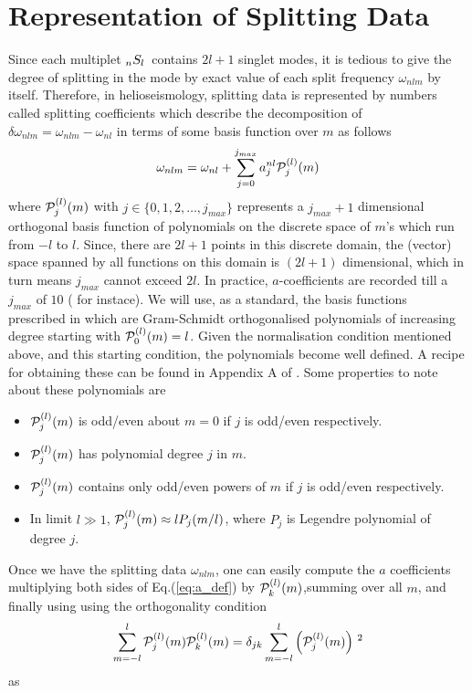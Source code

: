 \section{Representation of Splitting Data}
Since each multiplet $_{n}S_{l}\,$ contains $2l+1$ singlet modes, it is tedious to give the degree of splitting in the mode by exact value of each split frequency $\omega_{nlm}$ by itself. Therefore, in helioseismology, splitting data is represented by numbers called splitting coefficients which describe the decomposition of $\delta\omega_{nlm} = \omega_{nlm}-\omega_{nl}$ in terms of some basis function over $m$ as follows
\begin{equation}
\omega_{nlm} = \omega_{nl} + \sum_{j=0}^{j_{max}} a^{nl}_j \mathcal{P}^{(l)}_j(m)
\label{eq:a_def}
\end{equation}
where $\mathcal{P}^{(l)}_{j}(m)$ with $j\in \{0,1,2,\ldots, j_{max}\}$ represents a $j_{max}+1$ dimensional orthogonal basis function of polynomials on the discrete space of $m$'s which run from $-l$ to $l$. Since, there are $2l+1$ points in this discrete domain, the (vector) space spanned by all functions on this domain is $(2l+1)$ dimensional, which in turn means $j_{max}$ cannot exceed $2l$. In practice, $a$-coefficients are recorded till a $j_{max}$ of $10$ (\cite{schou_data} for instace). We will use, as a standard, the basis functions prescribed in \cite{ritzwoller} which are Gram-Schmidt orthogonalised polynomials of increasing degree starting with $\mathcal{P}^{(l)}_0(m) = l$. Given the normalisation condition mentioned above, and this starting condition, the polynomials become well defined. A recipe for obtaining these can be found in Appendix A of \cite{schou_pol_94}. Some properties to note about these polynomials are
\begin{itemize}
\item $\mathcal{P}^{(l)}_j(m)$ is odd/even about $m=0$ if $j$ is odd/even respectively.
\item $\mathcal{P}^{(l)}_j(m)$ has polynomial degree $j$ in $m$.
\item $\mathcal{P}^{(l)}_j(m)$ contains only odd/even powers of $m$ if $j$ is odd/even respectively.
\item In limit $l \gg 1$, $\mathcal{P}^{(l)}_j(m) \approx lP_{j}(m/l)$, where $P_j$ is Legendre polynomial of degree $j$.
\end{itemize}

Once we have the splitting data $\omega_{nlm}$, one can easily compute the $a$ coefficients multiplying both sides of Eq.(\ref{eq:a_def}) by $\mathcal{P}^{(l)}_k(m)$,summing over all $m$, and finally using using the orthogonality condition $$\sum_{m=-l}^l \mathcal{P}^{(l)}_{j}(m) \mathcal{P}^{(l)}_{k}(m) = \delta_{jk} \sum_{m=-l}^l \left( \mathcal{P}^{(l)}_{j}(m) \right)\,^2$$
as

